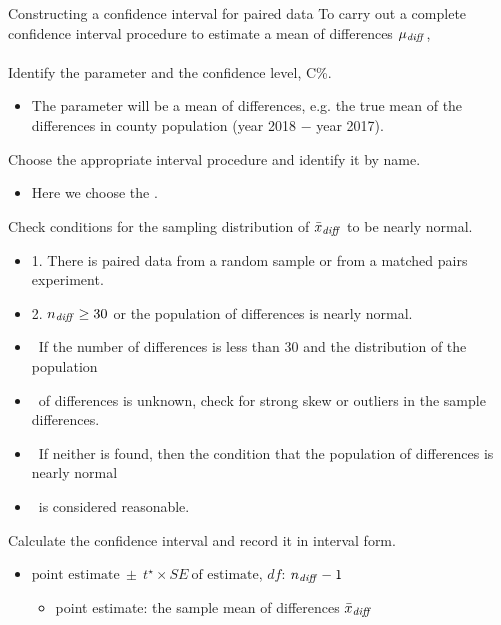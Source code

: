 \begin{onebox}{Constructing a confidence interval for paired data}
To carry out a complete confidence interval procedure to estimate a mean of differences $\mu_{\text{\emph{diff}}}$,
\\
\\
 Identify the parameter and the confidence level, C\%.\vspace{-1mm}
\begin{itemize} 
\item[] The parameter will be a mean of differences, e.g. the true mean of the differences in county population (year 2018 $-$ year 2017).  
\end{itemize}
 Choose the appropriate interval procedure and identify it by name. \vspace{-1mm}
\begin{itemize}
\item[] Here we choose the .
\end{itemize}
 Check conditions for the sampling distribution of $\bar{x}_{\text{\emph{diff}}}$ to be nearly normal.\vspace{-1mm}
\begin{itemize}
\setlength{\itemsep}{0mm}
\item[] 1. There is paired data from a random sample or from a matched pairs experiment.
\item[] 2. $n_{\text{\emph{diff}}}\ge 30$ or the population of differences is nearly normal.
 \item[] \quad \  If the number of differences is less than 30 and the distribution of the population 
 \item[] \quad \ of differences is unknown, check for strong skew or outliers in the sample differences.
\item[] \quad \ If neither is found, then the condition that the population of differences is nearly normal 
\item[] \quad \ is considered reasonable.  
\end{itemize}
  Calculate the confidence interval and record it in interval form.
\begin{itemize}
\item[] $\text{point estimate}\ \pm\ t^{\star} \times SE\ \text{of estimate}$, \quad $df$: $n_{\text{\emph{diff}}} - 1$
\begin{itemize}
\item[] point estimate: the sample mean of differences $\bar{x}_{\text{\emph{diff}}}$

\end{itemize}
\end{itemize}
\end{onebox}
